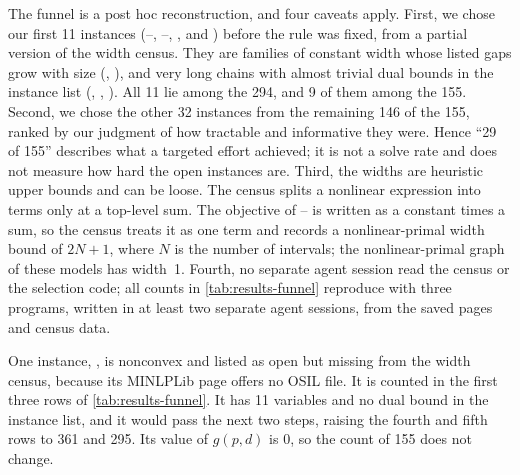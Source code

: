 The funnel is a post hoc reconstruction, and four caveats apply.
First, we chose our first 11 instances (--, --, ,  and ) before the rule was fixed, from a partial version of the width census.
They are families of constant width whose listed gaps grow with size (, ), and very long chains with almost trivial dual bounds in the instance list (, , ).
All 11 lie among the 294, and 9 of them among the 155.
Second, we chose the other 32 instances from the remaining 146 of the 155, ranked by our judgment of how tractable and informative they were.
Hence ``29 of 155'' describes what a targeted effort achieved; it is not a solve rate and does not measure how hard the open instances are.
Third, the widths are heuristic upper bounds and can be loose.
The census splits a nonlinear expression into terms only at a top-level sum.
The objective of -- is written as a constant times a sum, so the census treats it as one term and records a nonlinear-primal width bound of $2N+1$, where $N$ is the number of intervals; the nonlinear-primal graph of these models has width~1.
Fourth, no separate agent session read the census or the selection code; all counts in \cref{tab:results-funnel} reproduce with three programs, written in at least two separate agent sessions, from the saved pages and census data.

One instance, , is nonconvex and listed as open but missing from the width census, because its MINLPLib page offers no OSIL file.
It is counted in the first three rows of \cref{tab:results-funnel}.
It has 11 variables and no dual bound in the instance list, and it would pass the next two steps, raising the fourth and fifth rows to 361 and 295.
Its value of $g(p,d)$ is $0$, so the count of 155 does not change.
